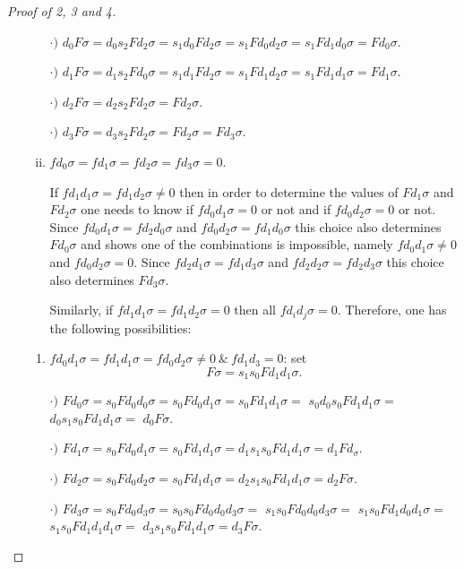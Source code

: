 \documentclass[thesis.tex]{subfiles}
\begin{document}
\begin{proof}[Proof of 2, 3 and 4]
\begin{enumerate}[a)]
\begin{enumerate}[i)]
        $\cdot)$ $d_0F\sigma=d_0s_2Fd_2\sigma=s_1d_0Fd_2\sigma=s_1Fd_0d_2\sigma=s_1Fd_1d_0\sigma=Fd_0\sigma$.

        $\cdot)$ $d_1F\sigma=d_1s_2Fd_0\sigma=s_1d_1Fd_2\sigma=s_1Fd_1d_2\sigma=s_1Fd_1d_1\sigma=Fd_1\sigma$.

        $\cdot)$ $d_2F\sigma=d_2s_2Fd_2\sigma=Fd_2\sigma$.

        $\cdot)$ $d_3F\sigma=d_3s_2Fd_2\sigma=Fd_2\sigma=Fd_3\sigma$.

        \item \underline{$fd_0\sigma=fd_1\sigma=fd_2\sigma=fd_3\sigma=0$}. \vspace*{5pt}\par
        If $fd_1d_1\sigma=fd_1d_2\sigma\neq 0$ then in order to determine the values of $Fd_1\sigma$ and $Fd_2\sigma$ one needs to know if $fd_0d_1\sigma=0$ or not and if $fd_0d_2\sigma=0$ or not. Since $fd_0d_1\sigma=fd_2d_0\sigma$ and $fd_0d_2\sigma=fd_1d_0\sigma$ this choice also determines $Fd_0\sigma$ and shows one of the combinations is impossible, namely $fd_0d_1\sigma\neq0$ and $fd_0d_2\sigma=0$. Since $fd_2d_1\sigma=fd_1d_3\sigma$ and $fd_2d_2\sigma=fd_2d_3\sigma$ this choice also determines $Fd_3\sigma$.\par

        Similarly, if $fd_1d_1\sigma=fd_1d_2\sigma=0$ then all $fd_id_j\sigma=0$. Therefore, one has the following possibilities:\par
        \end{enumerate}

            \begin{enumerate}[{iv}-a.]
            \item\underline{$fd_0d_1\sigma=fd_1d_1\sigma=fd_0d_2\sigma\neq0\ \&\ fd_1d_3=0$}: set
            $$F\sigma=s_1s_0Fd_1d_1\sigma.$$

            $\cdot)$ $Fd_0\sigma=s_0Fd_0d_0\sigma=s_0Fd_0d_1\sigma=s_0Fd_1d_1\sigma=$ $s_0d_0s_0Fd_1d_1\sigma=$ $d_0s_1s_0Fd_1d_1\sigma=$ $d_0F\sigma$.

            $\cdot)$ $Fd_1\sigma=s_0Fd_0d_1\sigma=s_0Fd_1d_1\sigma=d_1s_1s_0Fd_1d_1\sigma=d_1Fd_\sigma$.

            $\cdot)$ $Fd_2\sigma=s_0Fd_0d_2\sigma=s_0Fd_1d_1\sigma=d_2s_1s_0Fd_1d_1\sigma=d_2F\sigma$.

            $\cdot)$ $Fd_3\sigma=s_0Fd_0d_3\sigma=s_0s_0Fd_0d_0d_3\sigma=$ $s_1s_0Fd_0d_0d_3\sigma=$ $s_1s_0Fd_1d_0d_1\sigma=$ $s_1s_0Fd_1d_1d_1\sigma=$ $d_3s_1s_0Fd_1d_1\sigma=d_3F\sigma.$


\end{enumerate}
\end{enumerate}
\end{proof}
\end{document}

